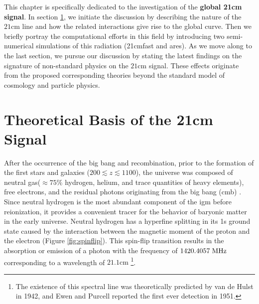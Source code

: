 \documentclass[12pt, TexShade, letterpaper]{report}
\begin{document}
This chapter is specifically dedicated to the investigation of the \textbf{global 21cm signal}. In section \ref{chap:global21cm,sub:physics}, we initiate the discussion by describing the nature of the $\mathrm{21cm}$ line and how the related interactions give rise to the global curve. Then we briefly portray the computational efforts in this field by introducing two semi-numerical simulations of this radiation (\gls{21cmfast} and \gls{ares}).
As we move along to the last section, we pursue our discussion by stating the latest findings on the signature of non-standard physics on the $\mathrm{21cm}$ signal. These effects originate from the proposed corresponding theories beyond the standard model of cosmology and particle physics.\par
\section{Theoretical Basis of the 21cm Signal}
\label{chap:global21cm,sub:physics}
After the occurrence of the big bang and recombination, prior to the formation of the first stars and galaxies ($200 \lesssim z \lesssim 1100$), the universe was composed of neutral gas($\approx 75\% $ hydrogen, helium, and trace quantities of heavy elements), free electrons, and the residual photons originating from the big bang (\gls{cmb}) \cite{map_universe, 21century}. Since neutral hydrogen is the most abundant component of the \gls{igm} before reionization, it provides a convenient tracer for the behavior of baryonic matter in the early universe. Neutral hydrogen has a hyperfine splitting in its 1s ground state caused by the interaction between the magnetic moment of the proton and the electron (Figure \ref{fig:spinflip}). This spin-flip transition results in the absorption or emission of a photon with the frequency of $\mathrm{1420.4057\hspace{0.1cm} MHz}$\cite{low_frequency} corresponding to a wavelength of $\mathrm{21.1cm}$ \cite{21century} \footnote{The existence of this spectral line was theoretically predicted by van de Hulst in 1942, and Ewen and Purcell reported the first ever detection in 1951\cite{21century}.}.\par
\end{document}
